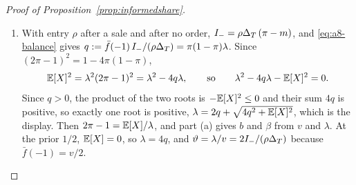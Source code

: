 \begin{proof}[Proof of Proposition~\ref{prop:informedshare}]
\begin{enumerate}[label=(\alph*),leftmargin=2em]
At this slot and the prior \(1/2\), \(M'=(1+\vartheta')/2\) and \(m'=(1-\vartheta')/2\) by the standing paragraph. Let
\(\tau>1/2\). Under full two-sided trade, the posteriors after a sale and after no order are \(m'<1/2<\tau\), so
entry after them is \(\rho\), and when an indifferent high-cost rival prepares, entry after a purchase is one
exactly when \(M'\ge\tau\) and \(\rho\) otherwise. Weighting by \(\bar f(1)=v/2\) gives the entry formula. By
Lemma~\ref{lem:trading}, the sale earns \(K_L-k=\rho\DT\,m'-k\), and the purchase earns
\(K_H-k=e(1)\DT\,(1-M')-k\ge\rho\DT\,m'-k\), because \(1-M'=m'\) and \(e(1)\ge\rho\). Wrong-signed orders never pay. When
an indifferent informed trader may mix over its best orders, full orders are optimal exactly when \(K_L\ge k\) and
\(K_H\ge k\), that is exactly when \(\rho\DT(1-\vartheta')/2\ge k\); when an indifferent informed trader abstains, the two
inequalities are strict. The first condition is \(\vartheta'\le1-2k/(\rho\DT)\), and the second the same with strict
inequality. The paragraph on constructed tuples in Appendix~\ref{app:beliefs} completes the tuple under either tie rule for the rival, so these are also the conditions for an equilibrium.
\item With entry \(\rho\) after a sale and after no order, \(I_-=\rho\Delta_T\,(\pi-m)\), and \eqref{eq:a8-balance} gives
\(q:=\bar f(-1)\,I_-/(\rho\Delta_T)=\pi(1-\pi)\lambda\). Since \((2\pi-1)^2=1-4\pi(1-\pi)\),
\[
\mathbb{E}[X]^2=\lambda^2(2\pi-1)^2=\lambda^2-4q\lambda,\qquad\text{so}\qquad \lambda^2-4q\lambda-\mathbb{E}[X]^2=0 .
\]
Since \(q>0\), the product of the two roots is \(-\mathbb{E}[X]^2\le0\) and their sum \(4q\) is positive, so exactly one root is
positive, \(\lambda=2q+\sqrt{4q^2+\mathbb{E}[X]^2}\), which is the display. Then \(2\pi-1=\mathbb{E}[X]/\lambda\), and part (a)
gives \(b\) and \(\beta\) from \(v\) and \(\lambda\). At the prior \(1/2\), \(\mathbb{E}[X]=0\), so \(\lambda=4q\), and
\(\vartheta=\lambda/v=2I_-/(\rho\Delta_T)\) because \(\bar f(-1)=v/2\).\qedhere
\end{enumerate}
\end{proof}

